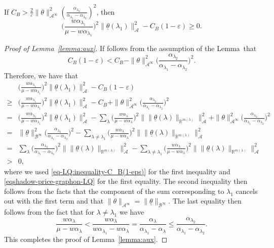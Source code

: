 \documentclass[10pt,a4paper]{amsart}
\def\al{\alpha}
\newcommand{\R}{{\mathbb R}}
\newcommand{\be}{\begin{equation}}
\newcommand{\ee}{\end{equation}}
\begin{document}
\begin{lemma}\label{lemma:aux}
    If $C_B>\frac{2}{\varepsilon}\|\theta\|_{\mathcal{A}^\infty}^2(\frac{\al_{\lambda_{2}}}{\al_{\lambda_1}-\al_{\lambda_{2}}})^2$, then 
    $$
\Big(\frac{w\al_{\lambda_1}}{\mu-w\al_{\lambda_1}}\Big)^2\|\underline{\theta}(\lambda_1)\|_{\mathcal{A}}^2- C_B(1-\varepsilon)\geq 0.
    $$
\end{lemma}

\begin{proof}[Proof of Lemma~\ref{lemma:aux}]
If follows from the assumption of the Lemma~that 
\be\label{eq-LQ:inequality-C_B(1-eps)}
C_B(1-\varepsilon)<C_B-\|\theta\|_{\mathcal{A}^\infty}^2\Big(\frac{\al_{\lambda_{2}}}{\al_{\lambda_1}-\al_{\lambda_{2}}}\Big)^2.
\ee
Therefore, we have that
\be\begin{aligned}
    &\Big(\frac{w\al_{\lambda_1}}{\mu-w\al_{\lambda_1}}\Big)^2\|\underline{\theta}(\lambda_1)\|_{\mathcal{A}}^2- C_B(1-\varepsilon)\\
    \geq& \Big(\frac{w\al_{\lambda_1}}{\mu-w\al_{\lambda_1}}\Big)^2\|\underline{\theta}(\lambda_1)\|_{\mathcal{A}}^2-C_B+\|\theta\|_{\mathcal{A}^\infty}^2\Big(\frac{\al_{\lambda_{2}}}{\al_{\lambda_1}-\al_{\lambda_{2}}}\Big)^2\\
    =&\Big(\frac{w\al_{\lambda_1}}{\mu-w\al_{\lambda_1}}\Big)^2\|\underline{\theta}(\lambda_1)\|_{\mathcal{A}}^2
    -\sum_{\lambda}\big(\frac{w\al_\lambda}{\mu-w\al_\lambda}\big)^2\big\|\|\underline{\theta}(\lambda)\|_{\R^{m(\lambda)}}\big\|_{\mathcal{A}}^2+\|\theta\|_{\mathcal{A}^\infty}^2\Big(\frac{\al_{\lambda_{2}}}{\al_{\lambda_1}-\al_{\lambda_{2}}}\Big)^2\\
    =&\|\underline{\theta}\|_{\mathcal{B}^\infty}^2\Big(\frac{\al_{\lambda_{2}}}{\al_{\lambda_1}-\al_{\lambda_{2}}}\Big)^2-\sum_{\lambda\neq\lambda_1}\big(\frac{w\al_\lambda}{\mu-w\al_\lambda}\big)^2\big\|\|\underline{\theta}(\lambda)\|_{\R^{m(\lambda)}}\big\|_{\mathcal{A}}^2\\
    =&\sum_{\lambda}\big(\frac{\al_{\lambda_2}}{\al_{\lambda_1}-\al_{\lambda_2}}\big)^2\big\|\|\underline{\theta}(\lambda)\|_{\R^{m(\lambda)}}\big\|_{\mathcal{A}}^2-\sum_{\lambda\neq\lambda_1}\big(\frac{w\al_\lambda}{\mu-w\al_\lambda}\big)^2\big\|\|\underline{\theta}(\lambda)\|_{\R^{m(\lambda)}}\big\|_{\mathcal{A}}^2\\
    >&0,
\end{aligned}\ee
where we used \eqref{eq-LQ:inequality-C_B(1-eps)} for the first inequality and \eqref{eqshadow-price-graphon-LQ} for the first equality. The second inequality then follows from the facts that the component of the sum corresponding to $\lambda_1$ cancels out with the first term and that  $\|\theta\|_{\mathcal{A}^\infty}=\|\underline{\theta}\|_{\mathcal{B}^\infty}$. The last equality then follows from the fact that for $\lambda\neq\lambda_1$ we have
$$
\frac{w\al_{\lambda}}{\mu-w\al_{\lambda}}<\frac{w\al_{\lambda}}{w\al_{\lambda_1}-w\al_{\lambda}}=\frac{\al_{\lambda}}{\al_{\lambda_1}-\al_{\lambda}}\leq\frac{\al_{\lambda_2}}{\al_{\lambda_1}-\al_{\lambda_2}}.
$$
This completes the proof of Lemma~\ref{lemma:aux}.
\end{proof}
\end{document}
